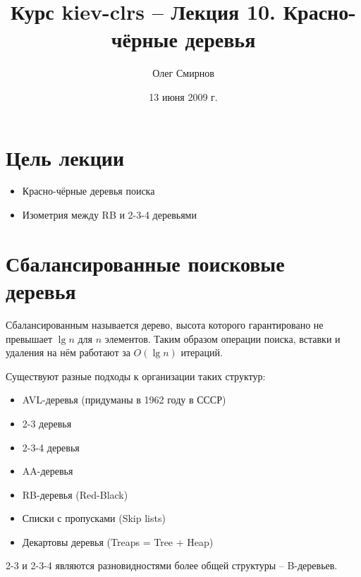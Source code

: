 \documentclass[11pt]{article}
\author{Олег Смирнов}
\title{Курс kiev-clrs -- Лекция 10. Красно-чёрные деревья}
\date{13 июня 2009 г.}
\begin{document}
\maketitle
\tableofcontents

\newpage
\setlength{\parskip}{1ex plus 0.5ex minus 0.2ex}
\section{Цель лекции}
\begin{itemize}
\item Красно-чёрные деревья поиска
\item Изометрия между RB и 2-3-4 деревьями
\end{itemize}

\section{Сбалансированные поисковые деревья}
Сбалансированным называется дерево, высота которого гарантировано не превышает $\lg n$ для $n$ элементов. Таким образом операции поиска, вставки и удаления на нём работают за $O(\lg n)$ итераций.

Существуют разные подходы к организации таких структур:
\begin{itemize}
\item AVL-деревья (придуманы в 1962 году в СССР)
\item 2-3 деревья
\item 2-3-4 деревья
\item AA-деревья
\item RB-деревья (Red-Black)
\item Списки с пропусками (Skip lists)
\item Декартовы деревья (Treaps = Tree + Heap)
\end{itemize}
2-3 и 2-3-4 являются разновидностями более общей структуры -- B-деревьев.
\end{document}

